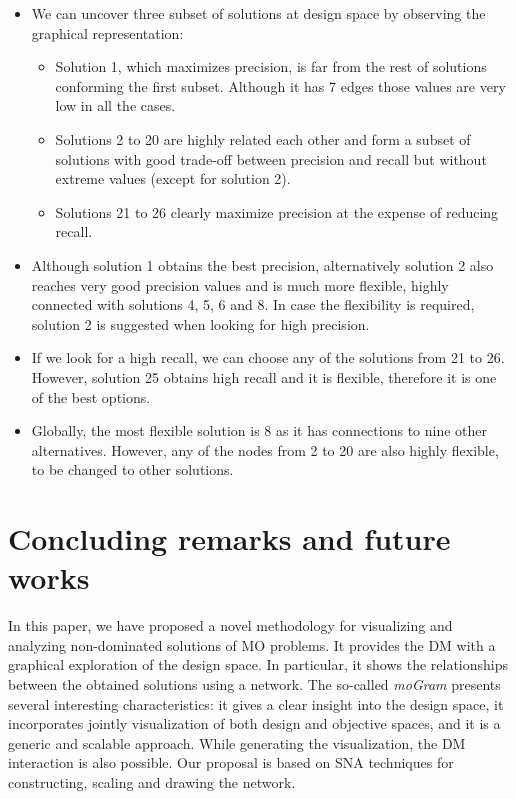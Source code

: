 \documentclass[journal]{IEEEtran}
\begin{document}
\begin{itemize}
\item We can uncover three subset of solutions at design space by observing the graphical representation:
  \begin{itemize}
  \item Solution 1, which maximizes precision, is far from the rest of solutions conforming the first subset. Although it has 7 edges those values are very low in all the cases.
  \item Solutions 2 to 20 are highly related each other and form a subset of solutions with good trade-off between precision and recall but without extreme values (except for solution 2). \item Solutions 21 to 26 clearly maximize precision at the expense of reducing recall.
  \end{itemize}
\item Although solution 1 obtains the best precision, alternatively solution 2 also reaches very good precision values and is much more flexible, highly connected with solutions 4, 5, 6 and 8. In case the flexibility is required, solution 2 is suggested when looking for high precision.
\item If we look for a high recall, we can choose any of the solutions from 21 to 26. However, solution 25 obtains high recall and it is flexible, therefore it is one of the best options.
\item Globally, the most flexible solution is 8 as it has connections to nine other alternatives. However, any of the nodes from 2 to 20 are also highly flexible, to be changed to other solutions.
\end{itemize}




\section{Concluding remarks and future works}
\label{conclusions}

In this paper, we have proposed a novel methodology for visualizing and analyzing non-dominated solutions of MO problems. It provides the DM with a graphical exploration of the design space. In particular, it shows the relationships between the obtained solutions using a network. The so-called \emph{moGram} presents several interesting characteristics: it gives a clear insight into the design space, it incorporates jointly visualization of both design and objective spaces, and it is a generic and scalable approach. While generating the visualization, the DM interaction is also possible. Our proposal is based on SNA techniques for constructing, scaling and drawing the network. 
\end{document}
